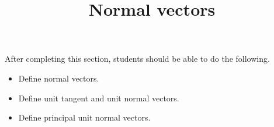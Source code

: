 \documentclass{ximera}
\title{Normal vectors}
\begin{document}
\begin{abstract}
\end{abstract}

\maketitle

\begin{sectionOutcomes}

After completing this section, students should be able to do the following.

\begin{itemize}
\item Define normal vectors.
\item Define unit tangent and unit normal vectors. 
\item Define principal unit normal vectors.
\end{itemize}

\end{sectionOutcomes}
\end{document}
